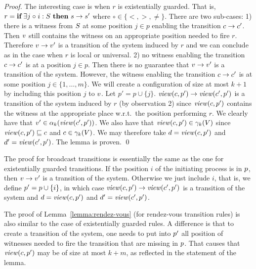 \begin{proof}
The interesting case is when $r$ is existentially guarded.
%
That is, $r = \quantrule{\loc}{\loc'}{\exists}{\circ}{\L}$ where $\circ\in\{<,>,\neq\}$.
%
There are two sub-cases:
%
1) there is a witness from $\L$ at some position $j\in p$ enabling the transition $\conf\trans\conf'$. 
%
Then $\view$ still contains the witness on an appropriate position needed to fire $r$. 
%
Therefore $\view\trans\view'$ is a transition of the system induced by $r$
%
and we can conclude as in the case when $r$ is local or universal. 
%
2) no witness enabling the transition $\conf\trans\conf'$ is at a position $j\in p$. 
%
Then there is no guarantee that $\view\trans\view'$ is a transition of the system. 
%
However, the witness enabling the transition $\conf\trans\conf'$ 
%
is at some position $j\in\{1,\ldots,m\}$. 
%
We will create a configuration of size at most $k+1$ by including this position $j$ to $\view$.
%
Let $p'= p\cup\{j\}$. 
%
$\viewof {\conf} {p'} \trans \viewof {\conf'} {p'}$ is a transition of the system induced by $r$ 
%
(by observation 2) since
%
$\viewof {\conf} {p'}$ contains the witness at the appropriate place w.r.t.\ the position performing $r$. 
%
We clearly have that $\view'\in\projof {\viewof {\conf'} {p'} } k$.
%
We also have that $\viewof {\conf} {p'} \in \gammaof k (V)$  
%
since $\viewof {\conf} {p'}\subword \conf$ and $\conf\in\gammaof k (V)$.
%
We may therefore take $\confd = \viewof {\conf} {p'}$ and $\confd' = \viewof {\conf'} {p'}$.
%
The lemma is proven.
%
\qed
\end{proof}

The proof for broadcast transitions is essentially the same as the one for existentially guarded transitions.
%
If the position $i$ of the initiating process is in $\pos$, 
%
then $\view\trans\view'$ is a transition of the system.
%
Otherwise we just include $i$, 
%
that is, we define $\pos' = \pos\cup\{i\}$, 
%
in which case $\viewof\conf{\pos'}\trans\viewof{\conf'}{\pos'}$ is a transition of the system
%
and $\confd = \viewof\conf{\pos'}$ and $\confd' =\viewof{\conf'}{\pos'}$.

The proof of Lemma~\ref{lemma:rendez-vous} (for rendez-vous transition rules) 
%
is also similar to the case of existentially guarded rules.
%
A difference is that to create a transition of the system, 
%
one needs to put into $\pos'$ all position of witnesses needed to fire the transition that are missing in $\pos$.
%
That causes that $\viewof\conf{\pos'}$ may be of size at most $k+m$, 
%
as reflected in the statement of the lemma.



